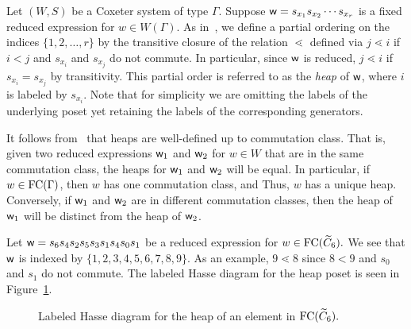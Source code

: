 Let $(W,S)$ be a Coxeter system of type $\Gamma$. Suppose $\mathsf{w}=s_{x_1}s_{x_2}\cdots s_{x_r}$ is a fixed reduced expression for $w \in W(\Gamma)$. As in~\cite{Stembridge1996}, we define a partial ordering on the indices $\{1, 2, \ldots, r\}$ by the transitive closure of the relation $\lessdot$ defined via $j \lessdot i$ if $i < j$ and $s_{x_i}$ and $s_{x_j}$ do not commute. In particular, since $\mathsf{w}$ is reduced, $j \lessdot i$ if $s_{x_i}=s_{x_j}$ by transitivity. This partial order is referred to as the \emph{heap} of $\mathsf{w}$, where $i$ is labeled by $s_{x_i}$. Note that for simplicity we are omitting the labels of the underlying poset yet retaining the labels of the corresponding generators.

It follows from~\cite{Stembridge1996} that heaps are well-defined up to commutation class. That is, given two reduced expressions $\mathsf{w}_1$ and $\mathsf{w}_2$ for $w \in W$ that are in the same commutation class, the heaps for $\mathsf{w}_1$ and $\mathsf{w}_2$ will be equal. In particular, if $w \in \mathrm{FC}(\Gamma)$, then $w$ has one commutation class, and Thus, $w$ has a unique heap. Conversely, if $\mathsf{w}_1$ and $\mathsf{w}_2$ are in different commutation classes, then the heap of $\mathsf{w}_1$ will be distinct from the heap of $\mathsf{w}_2$.

\begin{example}\label{ex:word}
Let $\mathsf{w}=s_6s_4s_2s_5s_3s_1s_4s_0s_1$ be a reduced expression for $w \in \mathrm{FC}(\widetilde{C}_6).$ We see that $\mathsf{w}$ is indexed by $\{1,2,3,4,5,6,7,8,9\}$. As an example, $9 \lessdot 8$ since $8 <9$ and $s_0$ and $s_1$ do not commute. The labeled Hasse diagram for the heap poset is seen in Figure~\ref{fig:Hasse}.
\begin{figure}[h]
\centering
{}
\caption{Labeled Hasse diagram for the heap of an element in $\mathrm{FC}(\widetilde{C}_6).$}
\label{fig:Hasse}	
\end{figure}
\end{example}

